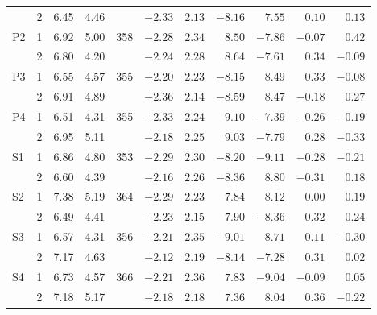 \documentclass{ieeeaccess}
\makeatletter
\newenvironment{appendixdisplay}[1]
  {\par\addvspace{4pt}\noindent\begin{minipage}{\linewidth}\def\@captype{#1}}
  {\end{minipage}\par\addvspace{6pt}}
\makeatother
\begin{document}
\begin{appendixdisplay}{table}
\begin{tabular*}{\linewidth}{@{\extracolsep{\fill}}lrrrrrrrrrr@{}}
 & 2 & 6.45 & 4.46 &  & $-2.33$ & $2.13$ & $-8.16$ & $7.55$ & $0.10$ & $0.13$ \\
P2 & 1 & 6.92 & 5.00 & 358 & $-2.28$ & $2.34$ & $8.50$ & $-7.86$ & $-0.07$ & $0.42$ \\
 & 2 & 6.80 & 4.20 &  & $-2.24$ & $2.28$ & $8.64$ & $-7.61$ & $0.34$ & $-0.09$ \\
P3 & 1 & 6.55 & 4.57 & 355 & $-2.20$ & $2.23$ & $-8.15$ & $8.49$ & $0.33$ & $-0.08$ \\
 & 2 & 6.91 & 4.89 &  & $-2.36$ & $2.14$ & $-8.59$ & $8.47$ & $-0.18$ & $0.27$ \\
P4 & 1 & 6.51 & 4.31 & 355 & $-2.33$ & $2.24$ & $9.10$ & $-7.39$ & $-0.26$ & $-0.19$ \\
 & 2 & 6.95 & 5.11 &  & $-2.18$ & $2.25$ & $9.03$ & $-7.79$ & $0.28$ & $-0.33$ \\
\hline
S1 & 1 & 6.86 & 4.80 & 353 & $-2.29$ & $2.30$ & $-8.20$ & $-9.11$ & $-0.28$ & $-0.21$ \\
 & 2 & 6.60 & 4.39 &  & $-2.16$ & $2.26$ & $-8.36$ & $8.80$ & $-0.31$ & $0.18$ \\
S2 & 1 & 7.38 & 5.19 & 364 & $-2.29$ & $2.23$ & $7.84$ & $8.12$ & $0.00$ & $0.19$ \\
 & 2 & 6.49 & 4.41 &  & $-2.23$ & $2.15$ & $7.90$ & $-8.36$ & $0.32$ & $0.24$ \\
S3 & 1 & 6.57 & 4.31 & 356 & $-2.21$ & $2.35$ & $-9.01$ & $8.71$ & $0.11$ & $-0.30$ \\
 & 2 & 7.17 & 4.63 &  & $-2.12$ & $2.19$ & $-8.14$ & $-7.28$ & $0.31$ & $0.02$ \\
S4 & 1 & 6.73 & 4.57 & 366 & $-2.21$ & $2.36$ & $7.83$ & $-9.04$ & $-0.09$ & $0.05$ \\
 & 2 & 7.18 & 5.17 &  & $-2.18$ & $2.18$ & $7.36$ & $8.04$ & $0.36$ & $-0.22$ \\
\hline
\end{tabular*}
\end{appendixdisplay}
\end{document}
